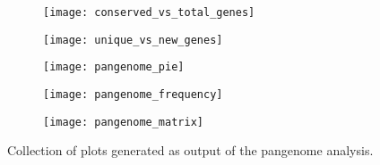 \begin{figure}[h!]	%
     \centering
     \begin{subfigure}[b]{0.4\textwidth}
         \centering
         \texttt{[image: conserved\_vs\_total\_genes]}
         \caption{}
         \label{fig:conserved vs total}
     \end{subfigure}
     \hfill
     \begin{subfigure}[b]{0.4\textwidth}
         \centering
         \texttt{[image: unique\_vs\_new\_genes]}
         \caption{}
         \label{fig:unique vs new}
     \end{subfigure}
     \hfill
     \begin{subfigure}[b]{0.45\textwidth}
         \centering
         \texttt{[image: pangenome\_pie]}
         \caption{}
         \label{fig:pangenome pie}
     \end{subfigure}
     \hfill
     \begin{subfigure}[b]{0.45\textwidth}
         \centering
         \texttt{[image: pangenome\_frequency]}
         \caption{}
         \label{fig:pangeome frequency}
     \end{subfigure}
     \hfill
     \begin{subfigure}[b]{0.85\textwidth}
         \centering
         \texttt{[image: pangenome\_matrix]}
         \caption{}
         \label{fig:pangenome matrix}
     \end{subfigure}
        \caption{\footnotesize{Collection of plots generated as output of the pangenome analysis.}}
        \label{fig:pangenome}
\end{figure}



% 





















